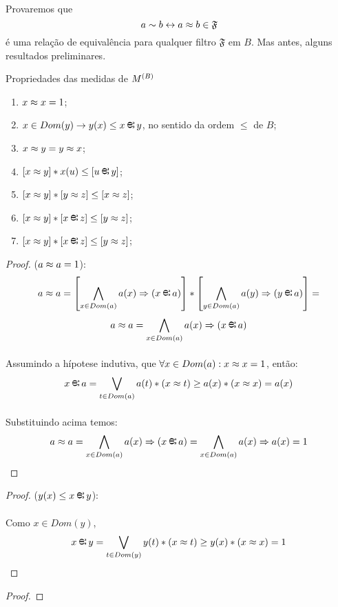     \paragraph{}
        Provaremos que
    $$ a \sim b \leftrightarrow a\approx b \in \mathfrak{F}$$ 
    é uma relação de equivalência para qualquer filtro $\mathfrak{F}$ em $B$. Mas antes, alguns resultados preliminares.
    \begin{proposition}{Propriedades das medidas de $M^{(B)}$}
        \begin{enumerate}
            \item $ x\approx x = 1$;
            \item $ x\in Dom(y) \rar y(x) \leq x\Min y$, no sentido da ordem $\leq$ de $B$;
            \item $ x\approx y = y \approx x$;
            \item $[x\Meq y] *  x(u) \leq [u\Min y]$;
            \item $[x\approx y] * [y\approx z] \leq [x\approx z]$;
            \item $[x\Meq y] * [x\Min z] \leq [y\Meq z]$;
            \item $[x\Meq y] * [x\Min z] \leq [y\Meq z]$;
        \end{enumerate}
        \begin{proof}

            ($ a\approx a = 1$):
            $$a\Meq a = \left[\bigwedge_{x\in Dom(a)}a(x)\RAR (x\Min a)\right]*\left[\bigwedge_{y\in Dom(a)}a(y)\RAR (y\Min a)\right] = $$
            $$a\Meq a = \bigwedge_{x\in Dom(a)}a(x)\RAR (x\Min a)$$
            \paragraph{}
                Assumindo a hípotese indutiva, que $\forall x\in Dom(a):x\approx x = 1$, então:
            $$ x\Min a = \bigvee_{t\in Dom(a)} a(t)*(x\Meq t) \geq a(x)*(x\Meq x) = a(x)$$
            \paragraph{}
                Substituindo acima temos:
            $$a\Meq a = \bigwedge_{x\in Dom(a)}a(x)\RAR (x\Min a) = \bigwedge_{x\in Dom(a)}a(x)\RAR a(x) = 1$$\eop
        \end{proof}
        \begin{proof}
            
            ($ y(x) \leq x\Min y$):
            \paragraph{}
                Como $x\in Dom(y)$,
            $$ x\Min y = \bigvee_{t\in Dom(y)} y(t)*(x\Meq t)\geq y(x)*(x\Meq x) = 1$$\eop
        \end{proof}
        \begin{proof}
            

\end{proof}
\end{proposition}
